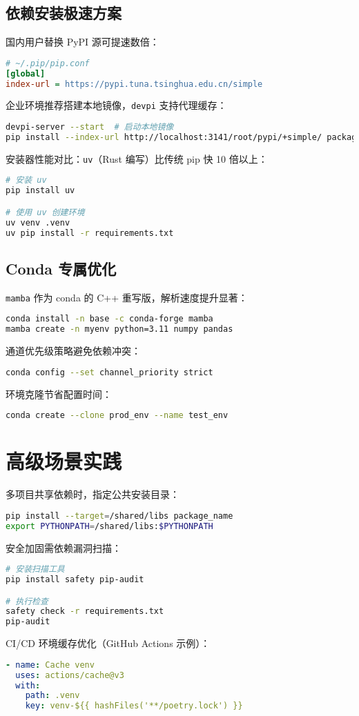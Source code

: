 \section{依赖安装极速方案}
国内用户替换 PyPI 源可提速数倍：\par
\begin{lstlisting}[language=ini]
# ~/.pip/pip.conf
[global]
index-url = https://pypi.tuna.tsinghua.edu.cn/simple
\end{lstlisting}
企业环境推荐搭建本地镜像，\texttt{devpi} 支持代理缓存：\par
\begin{lstlisting}[language=bash]
devpi-server --start  # 启动本地镜像
pip install --index-url http://localhost:3141/root/pypi/+simple/ package
\end{lstlisting}
安装器性能对比：\texttt{uv}（Rust 编写）比传统 pip 快 10 倍以上：\par
\begin{lstlisting}[language=bash]
# 安装 uv
pip install uv

# 使用 uv 创建环境
uv venv .venv  
uv pip install -r requirements.txt
\end{lstlisting}
\section{Conda 专属优化}
\texttt{mamba} 作为 conda 的 C++ 重写版，解析速度提升显著：\par
\begin{lstlisting}[language=bash]
conda install -n base -c conda-forge mamba
mamba create -n myenv python=3.11 numpy pandas
\end{lstlisting}
通道优先级策略避免依赖冲突：\par
\begin{lstlisting}[language=bash]
conda config --set channel_priority strict
\end{lstlisting}
环境克隆节省配置时间：\par
\begin{lstlisting}[language=bash]
conda create --clone prod_env --name test_env
\end{lstlisting}
\chapter{高级场景实践}
多项目共享依赖时，指定公共安装目录：\par
\begin{lstlisting}[language=bash]
pip install --target=/shared/libs package_name
export PYTHONPATH=/shared/libs:$PYTHONPATH
\end{lstlisting}
安全加固需依赖漏洞扫描：\par
\begin{lstlisting}[language=bash]
# 安装扫描工具
pip install safety pip-audit

# 执行检查
safety check -r requirements.txt
pip-audit
\end{lstlisting}
CI/CD 环境缓存优化（GitHub Actions 示例）：\par
\begin{lstlisting}[language=yaml]
- name: Cache venv
  uses: actions/cache@v3
  with:
    path: .venv
    key: venv-${{ hashFiles('**/poetry.lock') }}
\end{lstlisting}
